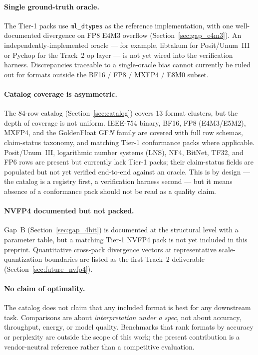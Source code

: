\documentclass[11pt,letterpaper]{article}
\begin{document}
\paragraph{Single ground-truth oracle.}
The Tier-1 packs use \texttt{ml\_dtypes} \cite{mldtypes} as the reference
implementation, with one well-documented divergence on FP8 E4M3 overflow
(Section~\ref{sec:gap_e4m3}).  An independently-implemented oracle ---
for example, libtakum \cite{libtakum} for Posit/Unum~III or Pychop
\cite{pychop} for the Track~2 op layer --- is not yet wired into the
verification harness.  Discrepancies traceable to a single-oracle bias
cannot currently be ruled out for formats outside the BF16 / FP8 /
MXFP4 / E8M0 subset.

\paragraph{Catalog coverage is asymmetric.}
The 84-row catalog (Section~\ref{sec:catalog}) covers 13 format clusters,
but the depth of coverage is not uniform.  IEEE-754 binary, BF16, FP8
(E4M3/E5M2), MXFP4, and the GoldenFloat GF$N$ family are covered with
full row schemas, claim-status taxonomy, and matching Tier-1 conformance
packs where applicable.  Posit/Unum~III, logarithmic number systems
(LNS), NF4, BitNet, TF32, and FP6 rows are present but currently lack
Tier-1 packs; their claim-status fields are populated but not yet
verified end-to-end against an oracle.  This is by design --- the
catalog is a registry first, a verification harness second --- but it
means absence of a conformance pack should not be read as a quality claim.

\paragraph{NVFP4 documented but not packed.}
Gap~B (Section~\ref{sec:gap_4bit}) is documented at the structural level
with a parameter table, but a matching Tier-1 NVFP4 pack is not yet
included in this preprint.  Quantitative cross-pack divergence vectors
at representative scale-quantization boundaries are listed as the first
Track~2 deliverable (Section~\ref{sec:future_nvfp4}).

\paragraph{No claim of optimality.}
The catalog does not claim that any included format is best for any
downstream task.  Comparisons are about \emph{interpretation under a
spec}, not about accuracy, throughput, energy, or model quality.
Benchmarks that rank formats by accuracy or perplexity are outside the
scope of this work; the present contribution is a vendor-neutral
reference rather than a competitive evaluation.
\end{document}
